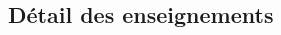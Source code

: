 \documentclass[10pt, a5paper]{report}
\begin{document}
\begin{spacing}{1.5}

%


\section*{Détail des enseignements}



\end{spacing}
\end{document}
